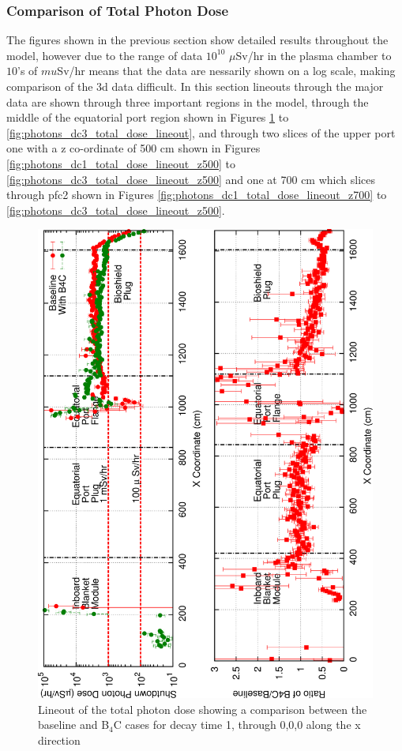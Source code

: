\documentclass[12pt]{article}
\begin{document}
\subsubsection{Comparison of Total Photon Dose}
The figures shown in the previous section show detailed results throughout the model, however due to the range of data
$10^10$ $\mu$Sv/hr in the plasma chamber to $10$'s of $mu$Sv/hr means that the data are nessarily shown on a log scale, 
making comparison of the 3d data difficult. In this section lineouts through the major data are shown through three 
important regions in the model, through the middle of the equatorial port region shown in Figures 
\ref{fig:photons_dc1_total_dose_lineout}  to \ref{fig:photons_dc3_total_dose_lineout}, and through two slices of the 
upper port one with a z co-ordinate of 500 cm  shown in Figures \ref{fig:photons_dc1_total_dose_lineout_z500} to \ref{fig:photons_dc3_total_dose_lineout_z500} and one at 700 cm which slices through \gls{pfc}2 shown in Figures \ref{fig:photons_dc1_total_dose_lineout_z700} to \ref{fig:photons_dc3_total_dose_lineout_z500}.

\begin{figure}[ht!]
\centering
\includegraphics[angle=-90,clip,scale=0.15]{../plots/photon_lineout/dc1_z0_lineout.png}
\caption{Lineout of the total photon dose showing a comparison between the baseline and B$_4$C cases for decay time 1,
         through 0,0,0 along the x direction}
\label{fig:photons_dc1_total_dose_lineout}
\end{figure}
\end{document}
